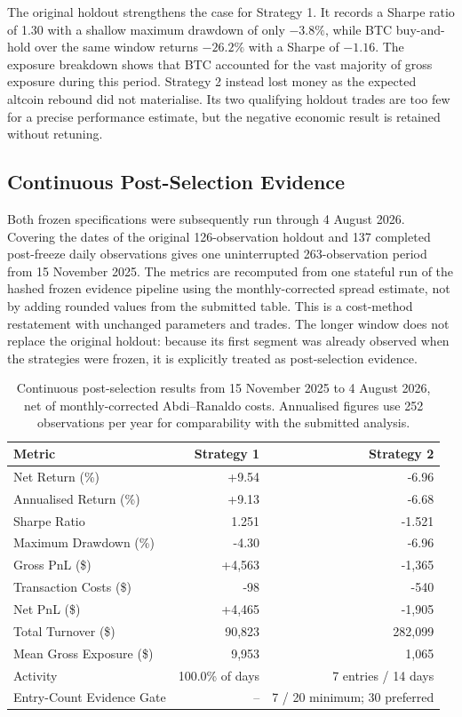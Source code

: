 \documentclass[10pt,a4paper]{article}
\begin{document}
The original holdout strengthens the case for Strategy 1. It records a Sharpe ratio of 1.30 with a shallow maximum drawdown of only $-3.8\%$, while BTC buy-and-hold over the same window returns $-26.2\%$ with a Sharpe of $-1.16$. The exposure breakdown shows that BTC accounted for the vast majority of gross exposure during this period. Strategy 2 instead lost money as the expected altcoin rebound did not materialise. Its two qualifying holdout trades are too few for a precise performance estimate, but the negative economic result is retained without retuning.

\subsection{Continuous Post-Selection Evidence}

Both frozen specifications were subsequently run through 4 August 2026. Covering the dates of the original 126-observation holdout and 137 completed post-freeze daily observations gives one uninterrupted 263-observation period from 15 November 2025. The metrics are recomputed from one stateful run of the hashed frozen evidence pipeline using the monthly-corrected spread estimate, not by adding rounded values from the submitted table. This is a cost-method restatement with unchanged parameters and trades. The longer window does not replace the original holdout: because its first segment was already observed when the strategies were frozen, it is explicitly treated as post-selection evidence.

\begin{table}[htbp]
\centering
\small
\setlength{\tabcolsep}{7pt}
\renewcommand{\arraystretch}{0.95}
\begin{tabular}{lrr}
\toprule
Metric & Strategy 1 & Strategy 2 \\
\midrule
Net Return (\%)          & +9.54 & -6.96 \\
Annualised Return (\%)   & +9.13  & -6.68 \\
Sharpe Ratio              & 1.251  & -1.521 \\
Maximum Drawdown (\%)    & -4.30  & -6.96 \\
Gross PnL (\$)            & +4,563 & -1,365 \\
Transaction Costs (\$)    & -98   & -540 \\
Net PnL (\$)              & +4,465 & -1,905 \\
Total Turnover (\$)       & 90,823 & 282,099 \\
Mean Gross Exposure (\$)  & 9,953  & 1,065 \\
Activity                   & 100.0\% of days & 7 entries / 14 days \\
Entry-Count Evidence Gate  & -- & 7 / 20 minimum; 30 preferred \\
\bottomrule
\end{tabular}
\caption{Continuous post-selection results from 15 November 2025 to 4 August 2026, net of monthly-corrected Abdi--Ranaldo costs. Annualised figures use 252 observations per year for comparability with the submitted analysis.}
\label{tab:post_selection_performance}
\end{table}
\FloatBarrier
\end{document}
